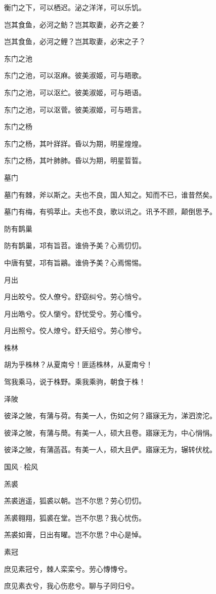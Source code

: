 衡门之下，可以栖迟。泌之洋洋，可以乐饥。

岂其食鱼，必河之鲂？岂其取妻，必齐之姜？

岂其食鱼，必河之鲤？岂其取妻，必宋之子？

东门之池

东门之池，可以沤麻。彼美淑姬，可与晤歌。

东门之池，可以沤纻。彼美淑姬，可与晤语。

东门之池，可以沤菅。彼美淑姬，可与晤言。

东门之杨

东门之杨，其叶牂牂。昏以为期，明星煌煌。

东门之杨，其叶肺肺。昏以为期，明星晢晢。

墓门

墓门有棘，斧以斯之。夫也不良，国人知之。知而不已，谁昔然矣。

墓门有梅，有鸮萃止。夫也不良，歌以讯之。讯予不顾，颠倒思予。

防有鹊巢

防有鹊巢，邛有旨苕。谁侜予美？心焉忉忉。

中唐有甓，邛有旨鷊。谁侜予美？心焉惕惕。

月出

月出皎兮。佼人僚兮。舒窈纠兮。劳心悄兮。

月出皓兮。佼人懰兮。舒忧受兮。劳心慅兮。

月出照兮。佼人燎兮。舒夭绍兮。劳心惨兮。

株林

胡为乎株林？从夏南兮！匪适株林，从夏南兮！

驾我乘马，说于株野。乘我乘驹，朝食于株！

泽陂

彼泽之陂，有蒲与荷。有美一人，伤如之何？寤寐无为，涕泗滂沱。

彼泽之陂，有蒲与蕳。有美一人，硕大且卷。寤寐无为，中心悁悁。

彼泽之陂，有蒲菡萏。有美一人，硕大且俨。寤寐无为，辗转伏枕。




国风·桧风


羔裘

羔裘逍遥，狐裘以朝。岂不尔思？劳心忉忉。

羔裘翱翔，狐裘在堂。岂不尔思？我心忧伤。

羔裘如膏，日出有曜。岂不尔思？中心是悼。

素冠

庶见素冠兮，棘人栾栾兮。劳心慱慱兮。

庶见素衣兮，我心伤悲兮。聊与子同归兮。

